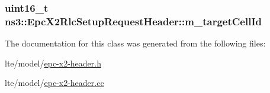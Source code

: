 \subsubsection[{\texorpdfstring{m\+\_\+target\+Cell\+Id}{m_targetCellId}}]{\setlength{\rightskip}{0pt plus 5cm}uint16\+\_\+t ns3\+::\+Epc\+X2\+Rlc\+Setup\+Request\+Header\+::m\+\_\+target\+Cell\+Id\hspace{0.3cm}{\ttfamily [private]}}\hypertarget{classns3_1_1EpcX2RlcSetupRequestHeader_ab145b5aab23b77ae59c52feed51f006c}{}\label{classns3_1_1EpcX2RlcSetupRequestHeader_ab145b5aab23b77ae59c52feed51f006c}


The documentation for this class was generated from the following files\+:\begin{DoxyCompactItemize}
\item 
lte/model/\hyperlink{epc-x2-header_8h}{epc-\/x2-\/header.\+h}\item 
lte/model/\hyperlink{epc-x2-header_8cc}{epc-\/x2-\/header.\+cc}\end{DoxyCompactItemize}
